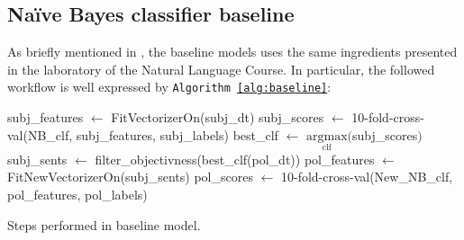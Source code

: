 \subsection{Na\"{i}ve Bayes classifier baseline}
\label{subsec:baseline}
As briefly mentioned in , the baseline models uses the same ingredients presented in the  laboratory of the Natural Language Course. In particular, the followed workflow is well expressed by \texttt{Algorithm \ref{alg:baseline}}:
\begin{algorithm}
    \SetAlgoLined
    \DontPrintSemicolon
    \CommentSty{\color{blue}}
        subj\_features $\gets$ FitVectorizerOn(subj\_dt)\;
        subj\_scores $\gets$ 10-fold-cross-val(NB\_clf, subj\_features, subj\_labels)\;
        best\_clf $\gets$ $\underset{\text{clf}}{\mathrm{argmax}} \bigr($subj\_scores$\bigl)$\;
        subj\_sents $\gets$ filter\_objectivness(best\_clf(pol\_dt))\;
        pol\_features $\gets$ FitNewVectorizerOn(subj\_sents)\;
        pol\_scores $\gets$ 10-fold-cross-val(New\_NB\_clf, pol\_features, pol\_labels)\;


\caption{Steps performed in baseline model.}
\label{alg:baseline}

\end{algorithm}

